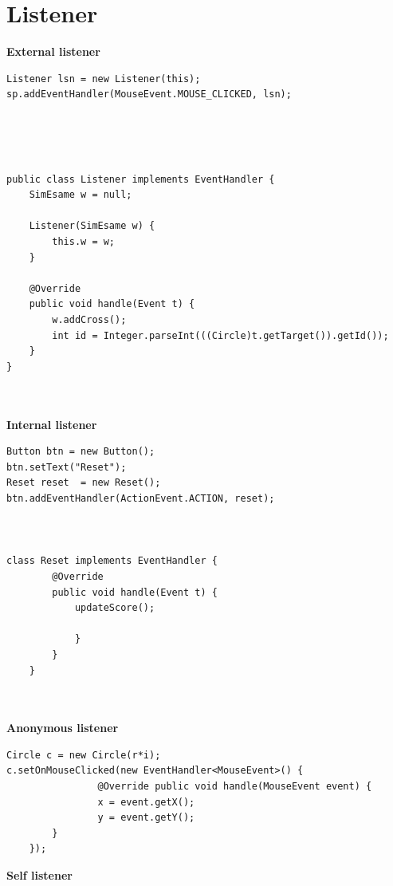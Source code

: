 \documentclass[10pt,a4paper]{book}
\begin{document}
\section{Listener}
\textbf{External listener}\\
\begin{verbatim}
Listener lsn = new Listener(this);
sp.addEventHandler(MouseEvent.MOUSE_CLICKED, lsn);

\end{verbatim}
\\\\\\
\begin{verbatim}
public class Listener implements EventHandler {
    SimEsame w = null;
     
    Listener(SimEsame w) {
        this.w = w;
    }
    
    @Override
    public void handle(Event t) {
        w.addCross();
        int id = Integer.parseInt(((Circle)t.getTarget()).getId());
    }
}

\end{verbatim}
\\\\
\textbf{Internal listener}\\
\begin{verbatim}
Button btn = new Button();
btn.setText("Reset");
Reset reset  = new Reset();
btn.addEventHandler(ActionEvent.ACTION, reset);



class Reset implements EventHandler {
        @Override
        public void handle(Event t) {
            updateScore();
                
            }
        }
    }

\end{verbatim}
\\\\
\textbf{Anonymous listener}\\
\begin{verbatim}
Circle c = new Circle(r*i);
c.setOnMouseClicked(new EventHandler<MouseEvent>() {
                @Override public void handle(MouseEvent event) {
                x = event.getX();
                y = event.getY();
        }
    });

\end{verbatim}
\newpage
\textbf{Self listener}\\\\
\end{document}
